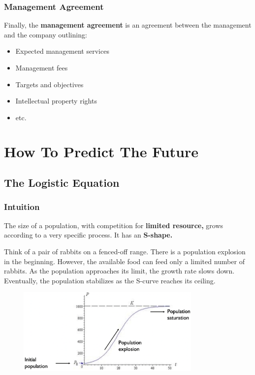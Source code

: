 \documentclass[a4paper]{extarticle}
\begin{document}
\subsubsection{Management Agreement}

Finally, the \textbf{management agreement} is an agreement between the management and the company outlining:

\begin{itemize}
    \item Expected management services
    \item Management fees
    \item Targets and objectives
    \item Intellectual property rights
    \item etc.
\end{itemize}

\section{How To Predict The Future}

\subsection{The Logistic Equation}

\subsubsection{Intuition}

\begin{tbox}
    The size of a population, with competition for \textbf{limited resource,} grows according to a very specific process. It has an \textbf{S-shape.}
\end{tbox}

Think of a pair of rabbits on a fenced-off range. There is a population explosion in the beginning. However, the available food can feed only a limited number of rabbits. As the population approaches its limit, the growth rate slows down. Eventually, the population stabilizes as the S-curve reaches its ceiling.

\begin{figure}[H]
    \includegraphics[width=9cm]{../images/EnpRisk_Fig5-2}
    \centering
\end{figure}
\end{document}
